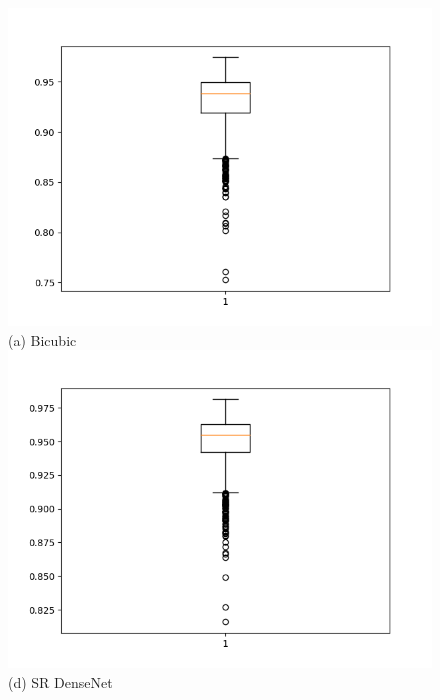 \documentclass[conference]{IEEEtran}
\begin{document}
\begin{figure}[h!]
  \centering
  \begin{minipage}{0.3\textwidth}
    \centering
    \includegraphics[width=\textwidth,height=0.2\textheight]{Figures/bicubic_ssim_Y.png}
    (a) Bicubic
    \includegraphics[width=\textwidth,height=0.2\textheight]{Figures/dense_ssim_Y.png}
    (d) SR DenseNet 
  \end{minipage}%
  \begin{minipage}{0.3\textwidth}
  \centering

\end{minipage}
\end{figure}
\end{document}
